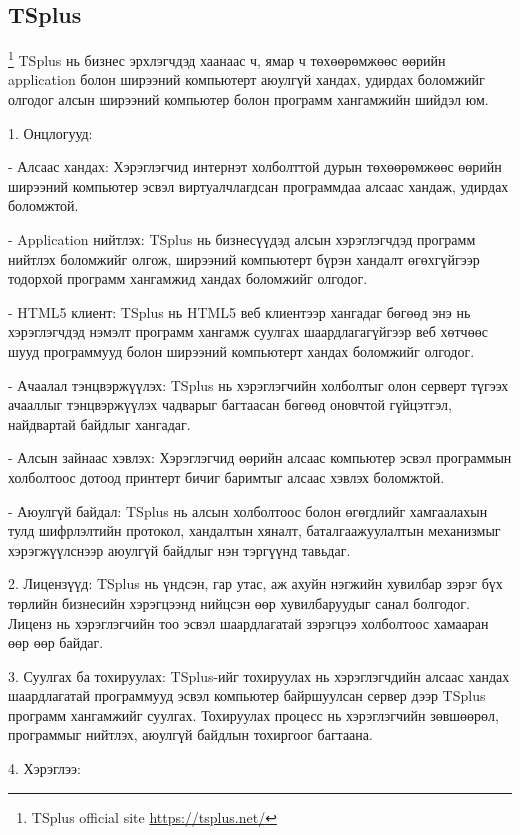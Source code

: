 \pagebreak

\subsection{TSplus}
\footnote{TSplus official site \url{https://tsplus.net/}}
	\quad \quad TSplus нь бизнес эрхлэгчдэд хаанаас ч, ямар ч төхөөрөмжөөс өөрийн application болон ширээний компьютерт аюулгүй хандах, удирдах боломжийг олгодог алсын ширээний компьютер болон программ хангамжийн шийдэл юм.

1. Онцлогууд: 

- Алсаас хандах: Хэрэглэгчид интернэт холболттой дурын төхөөрөмжөөс өөрийн ширээний компьютер эсвэл виртуалчлагдсан программдаа алсаас хандаж, удирдах боломжтой.

- Application нийтлэх: TSplus нь бизнесүүдэд алсын хэрэглэгчдэд программ нийтлэх боломжийг олгож, ширээний компьютерт бүрэн хандалт өгөхгүйгээр тодорхой программ хангамжид хандах боломжийг олгодог.

- HTML5 клиент: TSplus нь HTML5 веб клиентээр хангадаг бөгөөд энэ нь хэрэглэгчдэд нэмэлт программ хангамж суулгах шаардлагагүйгээр веб хөтчөөс шууд программууд болон ширээний компьютерт хандах боломжийг олгодог.

- Ачаалал тэнцвэржүүлэх: TSplus нь хэрэглэгчийн холболтыг олон серверт түгээх ачааллыг тэнцвэржүүлэх чадварыг багтаасан бөгөөд оновчтой гүйцэтгэл, найдвартай байдлыг хангадаг.

- Алсын зайнаас хэвлэх: Хэрэглэгчид өөрийн алсаас компьютер эсвэл программын холболтоос дотоод принтерт бичиг баримтыг алсаас хэвлэх боломжтой.

- Аюулгүй байдал: TSplus нь алсын холболтоос болон өгөгдлийг хамгаалахын тулд шифрлэлтийн протокол, хандалтын хяналт, баталгаажуулалтын механизмыг хэрэгжүүлснээр аюулгүй байдлыг нэн тэргүүнд тавьдаг.

2. Лицензүүд: TSplus нь үндсэн, гар утас, аж ахуйн нэгжийн хувилбар зэрэг бүх төрлийн бизнесийн хэрэгцээнд нийцсэн өөр хувилбаруудыг санал болгодог. Лиценз нь хэрэглэгчийн тоо эсвэл шаардлагатай зэрэгцээ холболтоос хамааран өөр өөр байдаг.

3. Суулгах ба тохируулах: TSplus-ийг тохируулах нь хэрэглэгчдийн алсаас хандах шаардлагатай программууд эсвэл компьютер байршуулсан сервер дээр TSplus программ хангамжийг суулгах. Тохируулах процесс нь хэрэглэгчийн зөвшөөрөл, программыг нийтлэх, аюулгүй байдлын тохиргоог багтаана. 

4. Хэрэглээ: 

